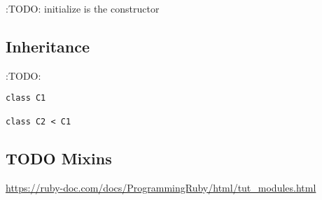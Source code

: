 \documentclass[11pt]{article}
\begin{document}
:TODO: initialize is the constructor

\subsection{Inheritance}
\label{sec:org499ad58}
:TODO:

\begin{verbatim}
class C1

class C2 < C1
\end{verbatim}

\subsection{{\bfseries\sffamily TODO} Mixins}
\label{sec:org67ab7ff}
\url{https://ruby-doc.com/docs/ProgrammingRuby/html/tut\_modules.html}
\end{document}
